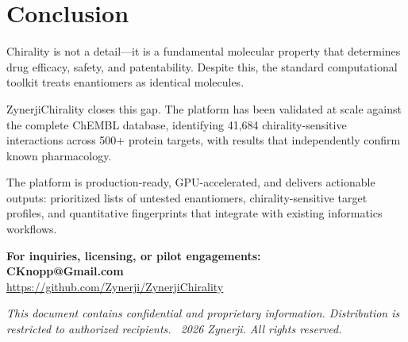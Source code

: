 \documentclass[11pt,a4paper]{article}
\begin{document}
\newpage

\section{Conclusion}

Chirality is not a detail---it is a fundamental molecular property that
determines drug efficacy, safety, and patentability. Despite this, the
standard computational toolkit treats enantiomers as identical molecules.

ZynerjiChirality closes this gap. The platform has been validated at scale
against the complete ChEMBL database, identifying 41,684 chirality-sensitive
interactions across 500+ protein targets, with results that independently
confirm known pharmacology.

The platform is production-ready, GPU-accelerated, and delivers actionable
outputs: prioritized lists of untested enantiomers, chirality-sensitive target
profiles, and quantitative fingerprints that integrate with existing
informatics workflows.

\vspace{1cm}

\begin{keyresult}
\centering
\textbf{For inquiries, licensing, or pilot engagements:}\\[8pt]
\textbf{CKnopp@Gmail.com}\\[4pt]
\url{https://github.com/Zynerji/ZynerjiChirality}
\end{keyresult}

\vspace{1cm}

\begin{center}
\small\color{gray}
\textit{This document contains confidential and proprietary information.
Distribution is restricted to authorized recipients.
\textcopyright\ 2026 Zynerji. All rights reserved.}
\end{center}
\end{document}
